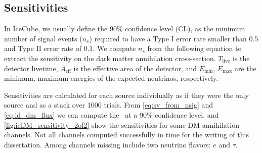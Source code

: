 \subsection{Sensitivities} \label{sec:icDM_sensitivity}

In IceCube, we usually define the 90\% confidence level (CL), as the minimum number of signal events ($n_s$) required to have a Type I error rate smaller than 0.5 and Type II error rate of 0.1.
We compute  $n_s$ from the following equation
\svFromNSig
to extract the sensitivity on the dark matter annihilation cross-section.
$T_\mathrm{live} $ is the detector livetime, $ A_\mathrm{eff} $ is the effective area of the detector, and $ E_\mathrm{min} $, $ E_\mathrm{max} $ are the minimum, maximum energies of the expected neutrinos, respectively.

Sensitivities are calculated for each source individually as if they were the only source and as a stack over 1000 trials.
From \cref{eq:sv_from_nsig} and \cref{eq:id_dm_flux} we can compute the \sv~at a 90\% confidence level.
 and \cref{fig:icDM_sensitivity_2of2} show the sensitivities for some DM annihilation channels.
Not all channels computed successfully in time for the writing of this dissertation.
Among channels missing include two neutrino flavors: $e$ and $\tau$.

